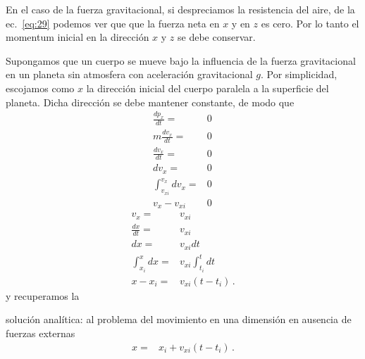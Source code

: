 En el caso de la fuerza gravitacional, si despreciamos la resistencia del aire, de la ec.~\eqref{eq:29} podemos ver que que la fuerza neta en $x$ y en $z$ es cero. Por lo tanto el momentum inicial en la dirección $x$ y $z$ se debe conservar. 

Supongamos que un cuerpo se mueve bajo la influencia de la fuerza gravitacional en un planeta sin atmosfera con aceleración gravitacional $g$. Por simplicidad, escojamos como $x$ la dirección inicial del cuerpo paralela a la superficie del planeta. Dicha dirección se debe mantener constante, de modo que
\begin{align}
  \frac{d p_x}{dt}=&0\nonumber\\
  m\frac{d v_x}{dt}=&0\nonumber\\
  \frac{d v_x}{dt}=&0\nonumber\\
  {d v_x}=&0\nonumber\\
  \int_{v_{xi}}^{v_x}{d v_x}=&0\nonumber\\
  v_x-v_{xi}&0\,
\end{align}
\begin{align}
  v_x=&v_{xi}\nonumber\\
  \frac{dx}{dt}=&v_{xi}\nonumber\\
  dx=&v_{xi}{dt}\nonumber\\
  \int_{x_i}^x dx=&v_{xi}\int_{t_i}^t{dt}\nonumber\\
  x-x_i=&v_{xi}(t-t_i)\,.
\end{align}
y recuperamos la
\begin{frame}
  \begin{block}%
{solución analítica:} al problema del movimiento en una dimensión en ausencia de fuerzas externas
\begin{align}
  \label{eq:30}
  x=&x_i+v_{xi}(t-t_i)\,.
\end{align}
  \end{block}
\end{frame}

